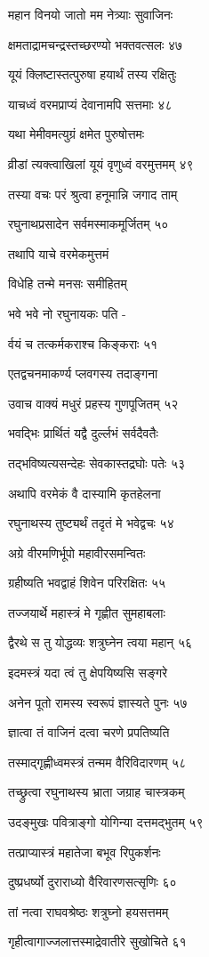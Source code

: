 महान विनयो जातो मम नेत्र्याः सुवाजिनः

क्षमताद्रामचन्द्रस्तच्छरण्यो भक्तवत्सलः ४७

यूयं क्लिष्टास्तत्पुरुषा हयार्थं तस्य रक्षितुः

याचध्वं वरमप्राप्यं देवानामपि सत्तमाः ४८

यथा मेमीवमत्युग्रं क्षमेत पुरुषोत्तमः

व्रीडां त्यक्त्वाखिलां यूयं वृणुध्वं वरमुत्तमम् ४९

तस्या वचः परं श्रुत्वा हनूमान्नि जगाद ताम्

रघुनाथप्रसादेन सर्वमस्माकमूर्जितम् ५०

तथापि याचे वरमेकमुत्तमं

विधेहि तन्मे मनसः समीहितम्

भवे भवे नो रघुनायकः पति -

र्वयं च तत्कर्मकराश्च किङ्कराः ५१

एतद्वचनमाकर्ण्य प्लवगस्य तदाङ्गना

उवाच वाक्यं मधुरं प्रहस्य गुणपूजितम् ५२

भवद्भिः प्रार्थितं यद्वै दुर्ल्लभं सर्वदैवतैः

तद्भविष्यत्यसन्देहः सेवकास्तद्रघोः पतेः ५३

अथापि वरमेकं वै दास्यामि कृतहेलना

रघुनाथस्य तुष्ट्यर्थं तदृतं मे भवेद्वचः ५४

अग्रे वीरमणिर्भूपो महावीरसमन्वितः

ग्रहीष्यति भवद्वाहं शिवेन परिरक्षितः ५५

तज्जयार्थे महास्त्रं मे गृह्णीत सुमहाबलाः

द्वैरथे स तु योद्धव्यः शत्रुघ्नेन त्वया महान् ५६

इदमस्त्रं यदा त्वं तु क्षेपयिष्यसि सङ्गरे

अनेन पूतो रामस्य स्वरूपं ज्ञास्यते पुनः ५७

ज्ञात्वा तं वाजिनं दत्वा चरणे प्रपतिष्यति

तस्माद्गृह्णीध्वमस्त्रं तन्मम वैरिविदारणम् ५८

तच्छ्रुत्वा रघुनाथस्य भ्राता जग्राह चास्त्रकम्

उदङ्मुखः पवित्राङ्गो योगिन्या दत्तमद्भुतम् ५९

तत्प्राप्यास्त्रं महातेजा बभूव रिपुकर्शनः

दुष्प्रधर्ष्यो दुराराध्यो वैरिवारणसत्सृणिः ६०

तां नत्वा राघवश्रेष्ठः शत्रुघ्नो हयसत्तमम्

गृहीत्वागाज्जलात्तस्माद्रेवातीरे सुखोचिते ६१

